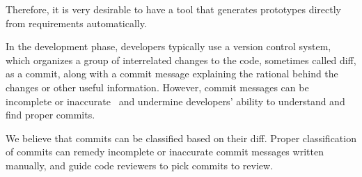 Therefore, it is very desirable to have a tool that generates prototypes directly from requirements automatically.




In the development phase, developers typically use a version control system,
which organizes a group of interrelated changes to the code, sometimes called diff, as a commit, along with a commit message explaining the rational behind the changes or other useful information.
However, commit messages can be incomplete or inaccurate~\cite{buse2010automatically} and undermine developers' ability to understand and find proper commits.

We believe that commits can be classified based on their diff.
Proper classification of commits can remedy incomplete or inaccurate commit messages written manually, and
guide code reviewers to pick commits to review.



